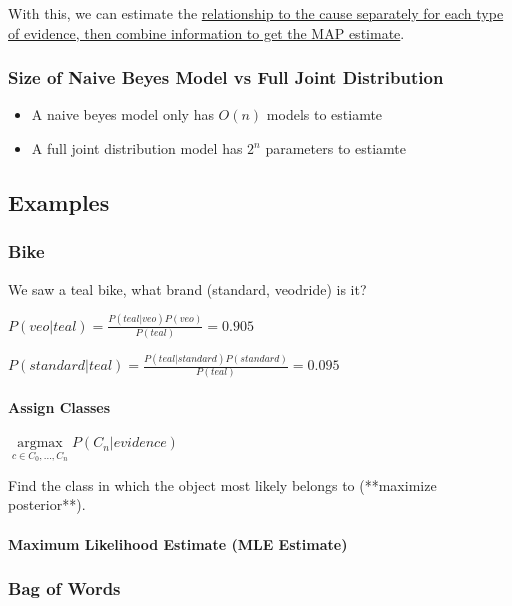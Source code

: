     With this, we can estimate the \ul{relationship to the cause separately
    for each type of evidence, then combine information to get the MAP
    estimate}.

    \subsubsection{Size of Naive Beyes Model vs Full Joint Distribution}

      \begin{itemize}
        \item A naive beyes model only has $ O\left( n \right) $ models to
        estiamte
        \item A full joint distribution model has $ 2^{n} $ parameters to
        estiamte
      \end{itemize}

  \subsection{Examples}

    \subsubsection{Bike}

      We saw a teal bike, what brand (standard, veodride) is it?

      $ P(veo | teal) = \frac{P(teal | veo) P(veo)}{P(teal)} = 0.905 $

      $ P(standard | teal) = \frac{P(teal | standard) P(standard)}{P(teal)} = 0.095 $

      \paragraph{Assign Classes}

      $ \underset{c\in C_{0}, ..., C_{n}}{\operatorname{argmax}} P( C_{n} | evidence) $

      Find the class in which the object most likely belongs to (**maximize posterior**).

      \paragraph{Maximum Likelihood Estimate (MLE Estimate)}

    \subsubsection{Bag of Words}


